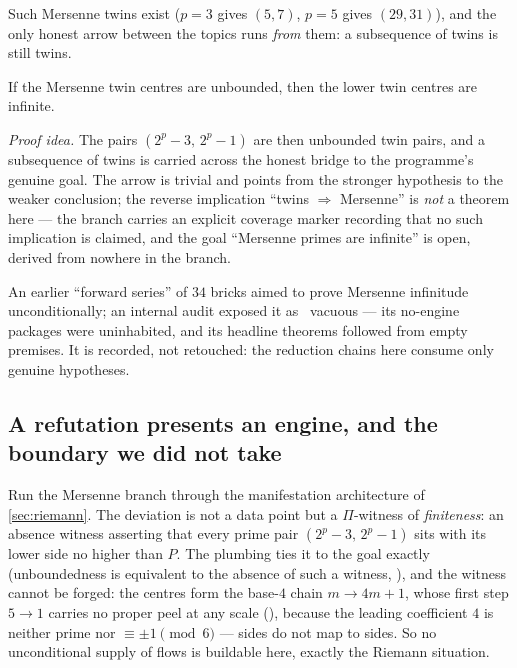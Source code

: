 Such Mersenne twins exist ($p=3$ gives $(5,7)$, $p=5$ gives $(29,31)$), and the only honest
arrow between the topics runs \emph{from} them: a subsequence of twins is still twins.

\begin{theorem}\label{thm:twinLowersInfinite_of_mersenneTwins}
\green{}\; If the Mersenne twin centres are unbounded, then the lower twin centres are
infinite. 
\end{theorem}

\emph{Proof idea.} The pairs $(2^p-3,\,2^p-1)$ are then unbounded twin pairs, and a
subsequence of twins is carried across the honest bridge to the programme's genuine goal.
The arrow is trivial and points from the stronger hypothesis to the weaker conclusion; the
reverse implication ``twins $\Rightarrow$ Mersenne'' is \emph{not} a theorem here --- the
branch carries an explicit coverage marker recording that no such implication is claimed, and
the goal ``Mersenne primes are infinite'' is \red{} open, derived from nowhere in the branch.

\begin{remark}
An earlier ``forward series'' of $34$ bricks aimed to prove Mersenne infinitude
unconditionally; an internal audit exposed it as \warn{}~vacuous --- its no-engine
packages were uninhabited, and its headline theorems followed from empty premises. It is
recorded, not retouched: the reduction chains here consume only genuine hypotheses.
\end{remark}

\subsection{A refutation presents an engine, and the boundary we did not take}

Run the Mersenne branch through the manifestation architecture of \cref{sec:riemann}. The
deviation is not a data point but a $\Pi$-witness of \emph{finiteness}: an absence witness
asserting that every prime pair $(2^p-3,\,2^p-1)$ sits with its lower side no higher than $P$.
The plumbing ties it to the goal exactly (unboundedness is equivalent to the absence of such a
witness, \green{}), and the witness cannot be forged: the centres form the base-$4$ chain
$m\to 4m+1$, whose first step $5\to 1$ carries no proper peel at any scale (\green{}), because
the leading coefficient $4$ is neither prime nor $\equiv\pm1\pmod 6$ --- sides do not map to
sides. So no unconditional supply of flows is buildable here, exactly the Riemann situation.

